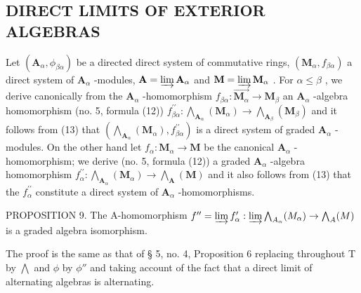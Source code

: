 \subsection{DIRECT LIMITS OF EXTERIOR ALGEBRAS}

Let \((\mathbf{A}_{\alpha},\phi_{\beta \alpha})\) be a directed direct system of commutative rings, \((\mathbf{M}_{\alpha},f_{\beta \alpha})\) a direct system of \(\mathbf{A}_{\alpha}\) -modules, \(\mathbf{A} = \varinjlim \mathbf{A}_{\alpha}\) and \(\mathbf{M} = \varinjlim \mathbf{M}_{\alpha}\) . For \(\alpha \leqslant \beta\) , we derive canonically from the \(\mathbf{A}_{\alpha}\) -homomorphism \(f_{\beta \alpha}: \overrightarrow{\mathbf{M}_{\alpha}} \to \mathbf{M}_{\beta}\) an \(\mathbf{A}_{\alpha}\) -algebra homomorphism (no. 5, formula (12)) \(f_{\beta \alpha}^{\prime \prime}: \bigwedge_{\mathbf{A}_{\alpha}} (\mathbf{M}_{\alpha}) \to \bigwedge_{\mathbf{A}_{\beta}} (\mathbf{M}_{\beta})\) and it follows from (13) that \((\bigwedge_{\mathbf{A}_{\alpha}} (\mathbf{M}_{\alpha}), f_{\beta \alpha}^{\prime \prime})\) is a direct system of graded \(\mathbf{A}_{\alpha}\) -modules. On the other hand let \(f_{\alpha}: \mathbf{M}_{\alpha} \to \mathbf{M}\) be the canonical \(\mathbf{A}_{\alpha}\) -homomorphism; we derive (no. 5, formula (12)) a graded \(\mathbf{A}_{\alpha}\) -algebra homomorphism \(f_{\alpha}^{\prime \prime}: \bigwedge_{\mathbf{A}_{\alpha}} (\mathbf{M}_{\alpha}) \to \bigwedge_{\mathbf{A}} (\mathbf{M})\) and it also follows from (13) that the \(f_{\alpha}^{\prime \prime}\) constitute a direct system of \(\mathbf{A}_{\alpha}\) -homomorphisms.

PROPOSITION 9. The A-homomorphism \(f'' = \varinjlim f_{\alpha}' : \varinjlim \bigwedge_{A_{\alpha}}(M_{\alpha}) \to \bigwedge_{A}(M)\) is a graded algebra isomorphism.

The proof is the same as that of § 5, no. 4, Proposition 6 replacing throughout T by \(\bigwedge\) and \(\phi\) by \(\phi''\) and taking account of the fact that a direct limit of alternating algebras is alternating.

